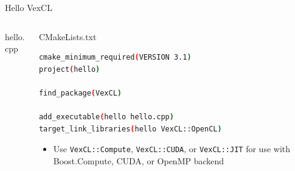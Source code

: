 \documentclass[@BEAMER_OPTIONS@]{beamer}
\newcommand{\code}[1]{\lstinline|#1|}
\begin{document}
\begin{frame}[fragile]{Hello VexCL}
    \vspace{-1\baselineskip}
    \begin{columns}
        \begin{column}[t]{0.5\textwidth}
            \begin{exampleblock}{hello.cpp}
                \begin{adjustbox}{width=0.9\textwidth, height=\textheight, keepaspectratio}
                    \begin{minipage}{\textwidth}
                        
                    \end{minipage}
                \end{adjustbox}
            \end{exampleblock}
        \end{column}
        \begin{column}[t]{0.45\textwidth}
            \begin{exampleblock}{CMakeLists.txt}
                \begin{adjustbox}{width=0.9\textwidth, height=\textheight, keepaspectratio}
                    \begin{minipage}{\textwidth}
                        \begin{lstlisting}[language=sh,
                        morekeywords={cmake_minimum_required,project,find_package,add_subdirectory,add_executable,target_link_libraries}]
cmake_minimum_required(VERSION 3.1)
project(hello)

find_package(VexCL)

add_executable(hello hello.cpp)
target_link_libraries(hello VexCL::OpenCL)
                        \end{lstlisting}
                    \end{minipage}
                \end{adjustbox}
            \end{exampleblock}
            \begin{itemize}
                \item Use \code{VexCL::Compute}, \code{VexCL::CUDA}, or
                    \code{VexCL::JIT} for use with Boost.Compute, CUDA, or
                    OpenMP backend
            \end{itemize}
        \end{column}
    \end{columns}
\end{frame}
\end{document}
